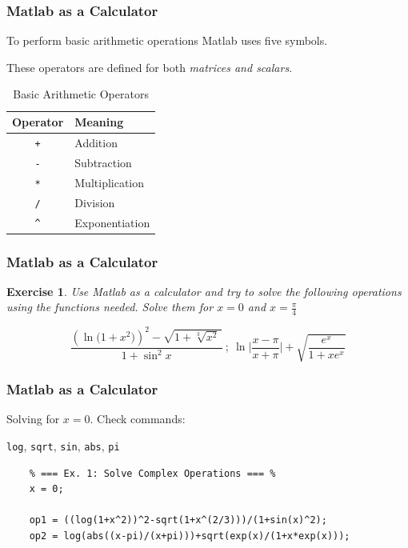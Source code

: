 \documentclass[11pt,xcolor={svgnames},aspectratio=169,usepdftitle=false]{beamer}
\let\toneitemize\itemize
\let\ttwoitemize\enditemize
\renewenvironment{itemize}{\toneitemize\addtolength{\itemsep}{1.35\baselineskip}}{\ttwoitemize}
\newtheorem{exercise}{Exercise}
\begin{document}
\begin{frame}[fragile]
    \frametitle{Matlab as a Calculator}
    \begin{itemize}
        \item To perform basic arithmetic operations Matlab uses five symbols.
        \item These operators are defined for both \alert{\textit{matrices and scalars}}.
    \end{itemize}
\begin{table}[htbp]
    \caption{Basic Arithmetic Operators}
    \label{tab:basic_operators}
    \begin{tabular}{@{}cl@{}}
    \toprule
    Operator & Meaning \\ \midrule
    \verb;+;  & Addition \\ 
    \verb;-;  & Subtraction \\ 
    \verb;*;  & Multiplication \\ 
    \verb;/;  & Division \\ 
    \verb;^;  & Exponentiation \\ \bottomrule
    \end{tabular}
\end{table}
\end{frame}

\begin{frame}
    \frametitle{Matlab as a Calculator}
\begin{exercise} 
    Use Matlab as a calculator and try to solve the following operations using the functions needed. Solve them for $x = 0$ and $x = \frac{\pi}{4}$
    
    \[
            \frac{\left(\ln\big( 1+x^2\big)\right)^2 - \sqrt{1+\sqrt[3]{x^2}\,}}{1+\sin^2 x} \ ; \  \ln\bigg\lvert\frac{x-\pi}{x+\pi}\bigg\rvert + \sqrt{\frac{e^x}{1+xe^x}}
    \]
\end{exercise}
\end{frame}

\begin{frame}[fragile]
    \frametitle{Matlab as a Calculator}
    Solving for $x = 0$. Check commands:
    \begin{itemize}
        \item \verb;log;, \verb;sqrt;, \verb;sin;, \verb;abs;, \verb;pi;
    \end{itemize}
\begin{lstlisting}
    % === Ex. 1: Solve Complex Operations === %
    x = 0;
    
    op1 = ((log(1+x^2))^2-sqrt(1+x^(2/3)))/(1+sin(x)^2);
    op2 = log(abs((x-pi)/(x+pi)))+sqrt(exp(x)/(1+x*exp(x)));
\end{lstlisting}
\end{frame}
\end{document}

